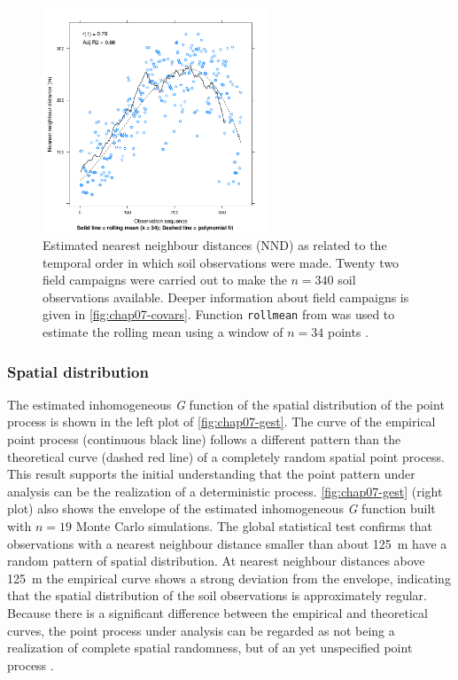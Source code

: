 \begin{figure}[!ht]
\centering
\includegraphics[trim=0mm 0mm 0mm 12mm, clip=true, width = 0.6\textwidth]{fig/chap07-nndistG}
\caption[Nearest neighbour distances and the order of soil observation.]{Estimated nearest neighbour distances 
(NND) as related to the temporal order in which soil observations were made. Twenty two field campaigns were 
carried out to make the $n = 340$ soil observations available. Deeper information about field campaigns is 
given in \autoref{fig:chap07-covars}. Function \texttt{rollmean} from  was used to estimate the 
rolling mean using a window of $n = 34$ points \cite{ZeileisEtAl2005}.}
\label{fig:chap07-nndistG}
\end{figure}

\subsubsection{Spatial distribution}

The estimated inhomogeneous \emph{G} function of the spatial distribution of the point process is shown in the 
left plot of \autoref{fig:chap07-gest}. The curve of the empirical point process (continuous black line) 
follows a different pattern than the theoretical curve (dashed red line) of a completely random spatial point 
process. This result supports the initial understanding that the point pattern under analysis can be the 
realization of a deterministic process. \autoref{fig:chap07-gest} (right plot) also shows the envelope of the 
estimated inhomogeneous \emph{G} function built with $n = 19$ Monte Carlo simulations. The global statistical 
test confirms that observations with a nearest neighbour distance smaller than about \SI{125}{\m} have a 
random pattern of spatial distribution. At nearest neighbour distances above \SI{125}{\m} the empirical curve 
shows a strong deviation from the envelope, indicating that the spatial distribution of the soil observations 
is approximately regular. Because there is a significant difference between the empirical and theoretical 
curves, the point process under analysis can be regarded as not being a realization of complete spatial 
randomness, but of an yet unspecified point process \cite{Baddeley2010}.

